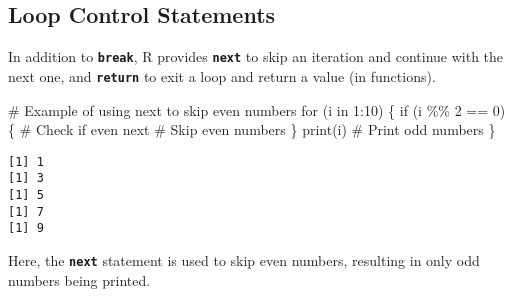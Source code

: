 \documentclass[
  letterpaper,
  DIV=11,
  numbers=noendperiod]{scrartcl}
\newenvironment{Shaded}{\begin{snugshade}}{\end{snugshade}}
\newcommand{\CommentTok}[1]{\textcolor[rgb]{0.37,0.37,0.37}{#1}}
\newcommand{\ControlFlowTok}[1]{\textcolor[rgb]{0.00,0.23,0.31}{#1}}
\newcommand{\DecValTok}[1]{\textcolor[rgb]{0.68,0.00,0.00}{#1}}
\newcommand{\FunctionTok}[1]{\textcolor[rgb]{0.28,0.35,0.67}{#1}}
\newcommand{\NormalTok}[1]{\textcolor[rgb]{0.00,0.23,0.31}{#1}}
\newcommand{\SpecialCharTok}[1]{\textcolor[rgb]{0.37,0.37,0.37}{#1}}
\begin{document}
\hypertarget{loop-control-statements}{%
\subsection{Loop Control Statements}\label{loop-control-statements}}

In addition to \textbf{\texttt{break}}, R provides
\textbf{\texttt{next}} to skip an iteration and continue with the next
one, and \textbf{\texttt{return}} to exit a loop and return a value (in
functions).

\begin{Shaded}
\begin{Highlighting}[]
\CommentTok{\# Example of using \textquotesingle{}next\textquotesingle{} to skip even numbers}
\ControlFlowTok{for}\NormalTok{ (i }\ControlFlowTok{in} \DecValTok{1}\SpecialCharTok{:}\DecValTok{10}\NormalTok{) \{}
  \ControlFlowTok{if}\NormalTok{ (i }\SpecialCharTok{\%\%} \DecValTok{2} \SpecialCharTok{==} \DecValTok{0}\NormalTok{) \{  }\CommentTok{\# Check if even}
    \ControlFlowTok{next}  \CommentTok{\# Skip even numbers}
\NormalTok{  \}}
  \FunctionTok{print}\NormalTok{(i)  }\CommentTok{\# Print odd numbers}
\NormalTok{\}}
\end{Highlighting}
\end{Shaded}

\begin{verbatim}
[1] 1
[1] 3
[1] 5
[1] 7
[1] 9
\end{verbatim}

Here, the \textbf{\texttt{next}} statement is used to skip even numbers,
resulting in only odd numbers being printed.

\begin{tcolorbox}[enhanced jigsaw, colback=white, colframe=quarto-callout-tip-color-frame, title=\textcolor{quarto-callout-tip-color}{\faLightbulb}\hspace{0.5em}{Tip}, coltitle=black, toprule=.15mm, breakable, toptitle=1mm, bottomtitle=1mm, opacitybacktitle=0.6, leftrule=.75mm, titlerule=0mm, arc=.35mm, rightrule=.15mm, colbacktitle=quarto-callout-tip-color!10!white, bottomrule=.15mm, left=2mm, opacityback=0]

\end{tcolorbox}
\end{document}
